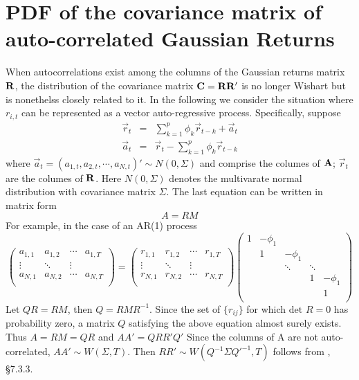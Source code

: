 \documentclass{report}
\begin{document}
\section{PDF of the covariance matrix of auto-correlated Gaussian
  Returns} \label{app:pdf_gaussian1}
When autocorrelations exist among the columns of the Gaussian returns
matrix $\mathbf{R}$, the distribution of the covariance matrix $\mathbf{C} =
\mathbf{R} \mathbf{R'}$ is no longer Wishart but is nonethelss closely
related to it. In the following we consider the situation where
$r_{i,t}$ can be represented as a vector auto-regressive
process. Specifically, suppose
\begin{eqnarray*}
  \vec{r}_t &=& \sum_{k=1}^p \phi_k \vec{r}_{t-k} + \vec{a}_t \\
  \vec{a}_t &=& \vec{r}_t - \sum_{k=1}^p \phi_k \vec{r}_{t-k}
\end{eqnarray*}
where $\vec{a}_t = (a_{1,t}, a_{2,t}, \cdots, a_{N,t})' \sim N(0,
\Sigma)$ and comprise the columes of $\mathbf{A}$; $\vec{r}_t$ are the
columes of $\mathbf{R}$. Here $N(0, \Sigma)$ denotes the multivarate
normal distribution with covariance matrix $\Sigma$. The last equation
can be written in matrix form
\[
A = R M
\]
For example, in the case of an AR(1) process
\begin{equation*}
  \begin{pmatrix}
    a_{1,1} & a_{1,2} & \cdots & a_{1,T} \\
    \vdots & \ddots & \vdots \\
    a_{N,1} & a_{N,2} & \cdots & a_{N,T} \\
  \end{pmatrix} =
  \begin{pmatrix}
    r_{1,1} & r_{1,2} & \cdots & r_{1,T} \\
    \vdots & \ddots & \vdots \\
    r_{N,1} & r_{N,2} & \cdots & r_{N,T} \\
  \end{pmatrix}
  \begin{pmatrix}
    1 & -\phi_1 &   &   & \\
      & 1 & -\phi_1 &   & \\
      &   & \ddots  & \ddots &   \\
      &   &   & 1 & -\phi_1 \\
      &   &   &   & 1 \\
  \end{pmatrix}
\end{equation*}
Let $QR = RM$, then $Q = RMR^{-1}$. Since the set of $\{r_{ij}\}$ for
which $\text{det } R = 0$ has probability zero, a matrix $Q$
satisfying the above equation almost surely exists. Thus $A = RM =
QR$ and $AA' = QRR'Q'$ Since the columns of A are not auto-correlated,
$AA' \sim W(\Sigma, T)$. Then $RR' \sim W(Q^{-1} \Sigma Q'^{-1}, T)$
follows from \cite{Anderson2003}, \S7.3.3.
\end{document}

